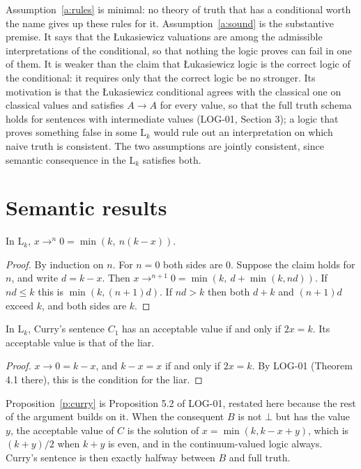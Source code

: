 \documentclass{situationist-preprint}
\begin{document}
Assumption~\ref{a:rules} is minimal: no theory of truth that has a conditional worth the name gives up these rules for it. Assumption~\ref{a:sound} is the substantive premise. It says that the Łukasiewicz valuations are among the admissible interpretations of the conditional, so that nothing the logic proves can fail in one of them. It is weaker than the claim that Łukasiewicz logic is the correct logic of the conditional: it requires only that the correct logic be no stronger. Its motivation is that the Łukasiewicz conditional agrees with the classical one on classical values and satisfies $A \to A$ for every value, so that the full truth schema holds for sentences with intermediate values (LOG-01, Section 3); a logic that proves something false in some $\mathrm{L}_k$ would rule out an interpretation on which naive truth is consistent. The two assumptions are jointly consistent, since semantic consequence in the $\mathrm{L}_k$ satisfies both.

\section{Semantic results}\label{s:sem}

\begin{lemma}\label{l:iter}
In $\mathrm{L}_k$, $x \to^n 0 = \min(k,\ n(k - x))$.
\end{lemma}

\begin{proof}
By induction on $n$. For $n = 0$ both sides are $0$. Suppose the claim holds for $n$, and write $d = k - x$. Then $x \to^{n+1} 0 = \min(k,\ d + \min(k, nd))$. If $nd \leq k$ this is $\min(k, (n+1)d)$. If $nd > k$ then both $d + k$ and $(n+1)d$ exceed $k$, and both sides are $k$.
\end{proof}

\begin{proposition}\label{p:curry}
In $\mathrm{L}_k$, Curry's sentence $C_1$ has an acceptable value if and only if $2x = k$. Its acceptable value is that of the liar.
\end{proposition}

\begin{proof}
$x \to 0 = k - x$, and $k - x = x$ if and only if $2x = k$. By LOG-01 (Theorem 4.1 there), this is the condition for the liar.
\end{proof}

Proposition~\ref{p:curry} is Proposition 5.2 of LOG-01, restated here because the rest of the argument builds on it. When the consequent $B$ is not $\bot$ but has the value $y$, the acceptable value of $C$ is the solution of $x = \min(k, k - x + y)$, which is $(k+y)/2$ when $k + y$ is even, and in the continuum-valued logic always. Curry's sentence is then exactly halfway between $B$ and full truth.
\end{document}
